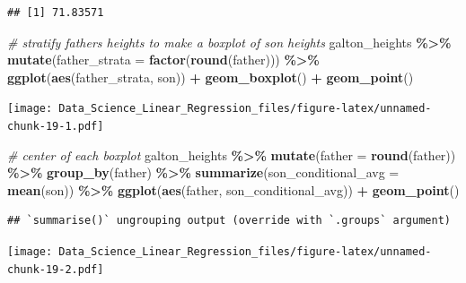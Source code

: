 \documentclass[
]{article}
\newenvironment{Shaded}{\begin{snugshade}}{\end{snugshade}}
\newcommand{\CommentTok}[1]{\textcolor[rgb]{0.56,0.35,0.01}{\textit{#1}}}
\newcommand{\DataTypeTok}[1]{\textcolor[rgb]{0.13,0.29,0.53}{#1}}
\newcommand{\KeywordTok}[1]{\textcolor[rgb]{0.13,0.29,0.53}{\textbf{#1}}}
\newcommand{\NormalTok}[1]{#1}
\newcommand{\OperatorTok}[1]{\textcolor[rgb]{0.81,0.36,0.00}{\textbf{#1}}}
\newcommand{\StringTok}[1]{\textcolor[rgb]{0.31,0.60,0.02}{#1}}
\begin{document}
\begin{verbatim}
## [1] 71.83571
\end{verbatim}

\begin{Shaded}
\begin{Highlighting}[]
\CommentTok{\# stratify fathers\textquotesingle{} heights to make a boxplot of son heights}
\NormalTok{galton\_heights }\OperatorTok{\%\textgreater{}\%}\StringTok{ }\KeywordTok{mutate}\NormalTok{(}\DataTypeTok{father\_strata =} \KeywordTok{factor}\NormalTok{(}\KeywordTok{round}\NormalTok{(father))) }\OperatorTok{\%\textgreater{}\%}
\StringTok{    }\KeywordTok{ggplot}\NormalTok{(}\KeywordTok{aes}\NormalTok{(father\_strata, son)) }\OperatorTok{+}
\StringTok{    }\KeywordTok{geom\_boxplot}\NormalTok{() }\OperatorTok{+}
\StringTok{    }\KeywordTok{geom\_point}\NormalTok{()}
\end{Highlighting}
\end{Shaded}

\texttt{[image: Data\_Science\_Linear\_Regression\_files/figure-latex/unnamed-chunk-19-1.pdf]}

\begin{Shaded}
\begin{Highlighting}[]
\CommentTok{\# center of each boxplot}
\NormalTok{galton\_heights }\OperatorTok{\%\textgreater{}\%}
\StringTok{    }\KeywordTok{mutate}\NormalTok{(}\DataTypeTok{father =} \KeywordTok{round}\NormalTok{(father)) }\OperatorTok{\%\textgreater{}\%}
\StringTok{    }\KeywordTok{group\_by}\NormalTok{(father) }\OperatorTok{\%\textgreater{}\%}
\StringTok{    }\KeywordTok{summarize}\NormalTok{(}\DataTypeTok{son\_conditional\_avg =} \KeywordTok{mean}\NormalTok{(son)) }\OperatorTok{\%\textgreater{}\%}
\StringTok{    }\KeywordTok{ggplot}\NormalTok{(}\KeywordTok{aes}\NormalTok{(father, son\_conditional\_avg)) }\OperatorTok{+}
\StringTok{    }\KeywordTok{geom\_point}\NormalTok{()}
\end{Highlighting}
\end{Shaded}

\begin{verbatim}
## `summarise()` ungrouping output (override with `.groups` argument)
\end{verbatim}

\texttt{[image: Data\_Science\_Linear\_Regression\_files/figure-latex/unnamed-chunk-19-2.pdf]}
\end{document}
